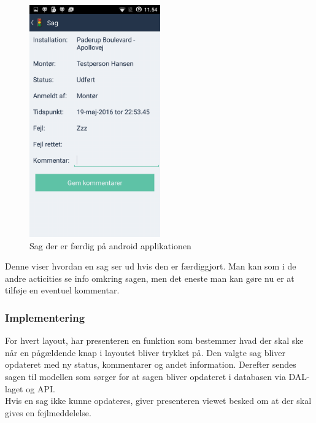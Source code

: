 	\begin{figure} [!ht]
		\begin{center}
			\includegraphics[height=10cm]{Android/Billeder/AndroidSagGron}
		\end{center}
		\caption{Sag der er færdig på android applikationen}
		\label{fig:Sag der er faerdig på android applikationen}
	\end{figure}
	Denne viser hvordan en sag ser ud hvis den er færdiggjort. Man kan som i de andre acticities se info omkring sagen, men det eneste man kan gøre nu er at tilføje en eventuel kommentar.

	
	\subsubsection{Implementering}
	For hvert layout, har presenteren en funktion som bestemmer hvad der skal ske når en pågældende knap i layoutet bliver trykket på. Den valgte sag bliver opdateret med ny status, kommentarer og andet information. Derefter sendes sagen til modellen som sørger for at sagen bliver opdateret i databasen via DAL-laget og API.\\
	Hvis en sag ikke kunne opdateres, giver presenteren viewet besked om at der skal gives en fejlmeddelelse. 
	\pagebreak